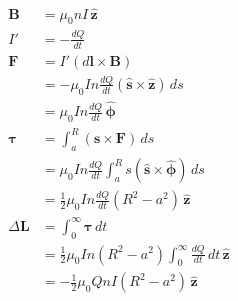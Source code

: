 \documentclass{article}
\renewcommand{\vec}[1]{\boldsymbol{\mathbf{#1}}}
\newcommand{\uvec}[1]{\hat{\vec{#1}}}
\begin{document}
\setcounter{subsection}{7}
\subsection{}

\begin{align*}
  \vec{B}        & = \mu_0 n I \,\uvec{z}                                                             \\
  I'             & = -\frac{d Q}{d t}                                                                 \\
  \vec{F}        & = I' (d \vec{l} \times \vec{B})                                                    \\
                 & = -\mu_0 I n \frac{d Q}{d t} (\uvec{s} \times \uvec{z}) \,d s                      \\
                 & = \mu_0 I n \frac{d Q}{d t} \,\uvec{\phi}                                          \\
  \vec{\tau}     & = \int_a^R (\vec{s} \times \vec{F}) \,d s                                          \\
                 & = \mu_0 I n \frac{d Q}{d t} \int_a^R s (\uvec{s} \times \uvec{\phi}) \,d s         \\
                 & = \frac{1}{2} \mu_0 I n \frac{d Q}{d t} (R^2 - a^2) \,\uvec{z}                     \\
  \Delta \vec{L} & = \int_0^\infty \vec{\tau} \,d t                                                   \\
                 & = \frac{1}{2} \mu_0 I n (R^2 - a^2) \int_0^\infty \frac{d Q}{d t} \,d t \,\uvec{z} \\
                 & = -\frac{1}{2} \mu_0 Q n I (R^2 - a^2) \,\uvec{z}
\end{align*}

\subsection{}
\end{document}
